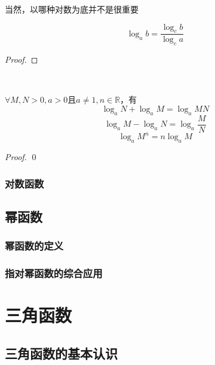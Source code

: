 当然，以哪种对数为底并不是很重要
\begin{theorem}[换底公式]
    \[\log_a b=\frac{\log_c b}{\log_c a}\]
\end{theorem}
\begin{proof}
    
\end{proof}

\begin{theorem}[对数的运算法则]
    \ 

    $\forall M,N>0,a>0$且$a\ne1,n\in\mathbb{R}$，有
    \[\log_aN+\log_aM=\log_aMN\]
    \[\log_aM-\log_aN=\log_a\frac{M}{N}\]
    \[\log_aM^n=n\log_aM\]
\end{theorem}
\begin{proof}
    

    \qed
\end{proof}
\begin{example}[对数表的应用]
    
\end{example}
\begin{example}
    
\end{example}

\begin{corollary}
    
\end{corollary}
\clearpage
\subsection{对数函数}

\clearpage
\section{幂函数}
\subsection{幂函数的定义}
\clearpage
\subsection{指对幂函数的综合应用}
\clearpage
\chapter{三角函数}
\section{三角函数的基本认识}

